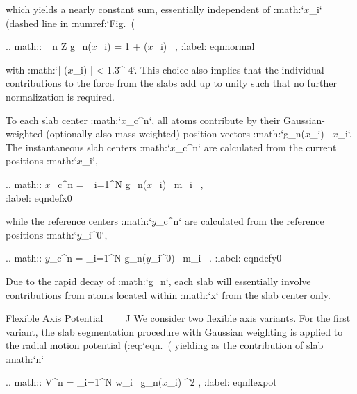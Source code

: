 which yields a nearly constant sum, essentially independent of
:math:`{\mbox{\boldmath ${x}$}}_i` (dashed line in
:numref:`Fig. (%

.. math:: \sum_{n \in Z} g_n({\mbox{\boldmath ${x}$}}_i) =  1 + \epsilon({\mbox{\boldmath ${x}$}}_i) \, ,
          :label: eqnnormal

with
:math:`| \epsilon({\mbox{\boldmath ${x}$}}_i) | < 1.3^{-4}`.
This choice also implies that the individual contributions to the force
from the slabs add up to unity such that no further normalization is
required.

To each slab center :math:`{\mbox{\boldmath ${x}$}}_c^n`, all atoms
contribute by their Gaussian-weighted (optionally also mass-weighted)
position vectors
:math:`g_n({\mbox{\boldmath ${x}$}}_i) \, {\mbox{\boldmath ${x}$}}_i`.
The instantaneous slab centers :math:`{\mbox{\boldmath ${x}$}}_c^n` are
calculated from the current positions
:math:`{\mbox{\boldmath ${x}$}}_i`,

.. math::  {\mbox{\boldmath ${x}$}}_c^n =
                {\sum_{i=1}^N g_n({\mbox{\boldmath ${x}$}}_i) \, m_i} \, ,\\
           :label: eqndefx0 

while the reference centers :math:`{\mbox{\boldmath ${y}$}}_c^n` are
calculated from the reference positions
:math:`{\mbox{\boldmath ${y}$}}_i^0`,

.. math:: {\mbox{\boldmath ${y}$}}_c^n =
               {\sum_{i=1}^N g_n({\mbox{\boldmath ${y}$}}_i^0) \, m_i} \, .
          :label: eqndefy0

Due to the rapid decay of :math:`g_n`, each slab will essentially
involve contributions from atoms located within :math:`\Delta x` from the slab center only.

Flexible Axis Potential
^^^^^^^^^^^^^^^^^^^^^^^

We consider two flexible axis variants. For the first variant, the slab
segmentation procedure with Gaussian weighting is applied to the radial
motion potential
(:eq:`eqn. (%
yielding as the contribution of slab :math:`n`

.. math::  V^n = 
            \sum_{i=1}^{N} w_i \, g_n({\mbox{\boldmath ${x}$}}_i) 
           \left[
           {\mbox{\boldmath ${q}$}}_i^n
           \cdot
            ({\mbox{\boldmath ${x}$}}_i - {\mbox{\boldmath ${x}$}}_c^n) 
           \right]^2  ,
           :label: eqnflexpot

